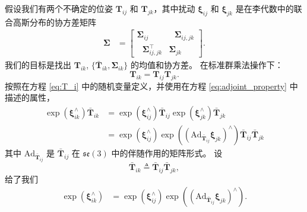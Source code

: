 假设我们有两个不确定的位姿 $\mathbf{T}_{ij}$ 和 $\mathbf{T}_{jk}$，其中扰动 $\boldsymbol{\xi}_{ij}$ 和 $\boldsymbol{\xi}_{jk}$ 是在李代数中的联合高斯分布的协方差矩阵 
\begin{align}
    \boldsymbol{\Sigma} 
    &= 
    \left[ \begin{array}{cc}
        \boldsymbol{\Sigma}_{ij} & ~~~\boldsymbol{\Sigma}_{ij,jk}  \\
        ~~~\boldsymbol{\Sigma}_{ij,jk}^\top & \boldsymbol{\Sigma}_{jk}
    \end{array} \right]. \nonumber
\end{align}
我们的目标是找出 $\mathbf{T}_{ik}$, $\{\bar{\mathbf{T}}_{ik}, \boldsymbol{\Sigma}_{ik}\}$ 的均值和协方差。 
在标准群乘法操作下：
\begin{equation}
    \mathbf{T}_{ik} = \mathbf{T}_{ij} \mathbf{T}_{jk}.
\end{equation}
按照在方程 \eqref{eq:T_i} 中的随机变量定义，并使用在方程 \eqref{eq:adjoint_property} 中描述的属性， 
\begin{align}
    \operatorname{exp}(\boldsymbol{\xi}_{ik}^\wedge) \bar{\mathbf{T}}_{ik} 
    &= 
    \operatorname{exp}(\boldsymbol{\xi}_{ij}^\wedge) \bar{\mathbf{T}}_{ij}
    \operatorname{exp}(\boldsymbol{\xi}_{jk}^\wedge) \bar{\mathbf{T}}_{jk} \nonumber\\
    &= 
    \operatorname{exp}(\boldsymbol{\xi}_{ij}^\wedge) \operatorname{exp}((\mathrm{Ad}_{\bar{\mathbf{T}}_{ij}}\boldsymbol{\xi}_{jk})^\wedge)
    \bar{\mathbf{T}}_{ij} \bar{\mathbf{T}}_{jk}
\end{align}
其中 $\mathrm{Ad}_{\bar{\mathbf{T}}_{ij}}$ 是 $\bar{\mathbf{T}}_{ij}$ 在 $\mathfrak{se}(3)$ 中的伴随作用的矩阵形式。
设
\begin{equation}
    \bar{\mathbf{T}}_{ik} \triangleq \bar{\mathbf{T}}_{ij} \bar{\mathbf{T}}_{jk}, \label{eq:pose_compound_mu}
\end{equation}
给了我们
\begin{align}
    \operatorname{exp}(\boldsymbol{\xi}_{ik}^\wedge) 
    &= \operatorname{exp}(\boldsymbol{\xi}_{ij}^\wedge) \operatorname{exp}((\mathrm{Ad}_{\bar{\mathbf{T}}_{ij}}\boldsymbol{\xi}_{jk})^\wedge).
\end{align}

